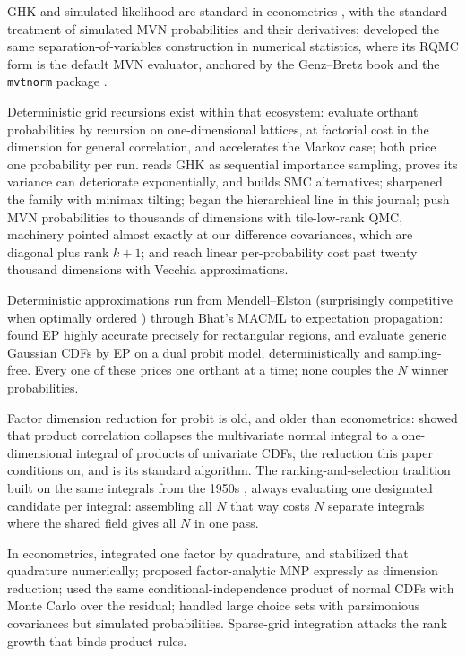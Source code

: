\documentclass[12pt]{article}
\theoremstyle{remark}
\begin{document}
GHK and simulated likelihood are standard in econometrics
\citep{geweke1994,hajivassiliou1998,train2009}, with
\citet{hmr1996} the standard treatment of simulated MVN probabilities
and their derivatives; \citet{genz1992}
developed the same separation-of-variables construction in numerical
statistics, where its RQMC form is the default MVN evaluator, anchored
by the Genz--Bretz book \citep{genzbretz2009} and the \texttt{mvtnorm}
package \citep{mi2009}.

Deterministic grid recursions exist within that ecosystem: \citet{miwa2003}
evaluate orthant probabilities by recursion on one-dimensional lattices,
at factorial cost in the dimension for general correlation, and
\citet{craig2008} accelerates the Markov case; both price one
probability per run. \citet{ridgway2016} reads GHK as sequential importance sampling, proves its
variance can deteriorate exponentially, and builds SMC alternatives; \citet{botev2017} sharpened the family with minimax tilting;
\citet{genton2018} began the hierarchical line in this journal;
\citet{cao2021} push MVN probabilities to thousands of
dimensions with tile-low-rank QMC, machinery pointed almost exactly at our
difference covariances, which are diagonal plus rank $k+1$; and
\citet{cao2025} reach linear per-probability cost past twenty thousand
dimensions with Vecchia approximations.

Deterministic approximations run from Mendell--Elston \citep{mendell1974}
(surprisingly competitive when optimally ordered \citep{connors2014})
through Bhat's MACML \citep{bhat2011} to expectation propagation:
\citet{cunningham2011} found EP
highly accurate precisely for rectangular regions, and \citet{fasano2025} evaluate generic Gaussian CDFs by EP on a dual probit
model, deterministically and sampling-free. Every one of these prices one
orthant at a time; none couples the $N$ winner probabilities.

Factor dimension reduction for probit is old, and older than
econometrics: \citet{curnow1962} showed that product correlation
collapses the multivariate normal integral to a one-dimensional integral
of products of univariate CDFs, the reduction this paper conditions on,
and \citet{dunnett1989} is its standard algorithm. The ranking-and-selection
tradition built on the same integrals from the 1950s
\citep{bechhofer1954,gupta1963}, always evaluating one designated
candidate per integral: assembling all $N$ that way costs $N$ separate
integrals where the shared field gives all $N$ in one pass.

In
econometrics, \citet{butler1982} integrated one factor by quadrature,
and \citet{lee2000} stabilized that quadrature numerically;
\citet{mcfadden1984} proposed factor-analytic MNP expressly as dimension
reduction; \citet{stern1992} used the same conditional-independence
product of normal CDFs with Monte Carlo over the residual;
\citet{bolduc1999} handled large choice sets with parsimonious
covariances but simulated probabilities. Sparse-grid integration
\citep{heiss2008} attacks the rank growth that binds product rules.
\end{document}

